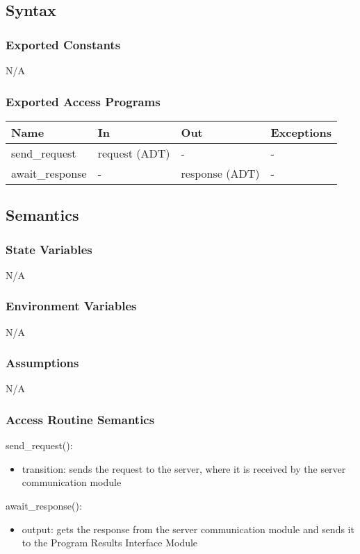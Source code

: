 \documentclass[12pt, titlepage]{article}
\begin{document}
\subsection{Syntax}

\subsubsection{Exported Constants}
N/A

\subsubsection{Exported Access Programs}

\begin{center}
\begin{tabular}{p{3cm} p{4cm} p{4cm} p{2cm}}
\hline
\textbf{Name} & \textbf{In} & \textbf{Out} & \textbf{Exceptions}\\
\hline%
send\_request & request (ADT) &- &-\\
await\_response &- &response (ADT) &-\\
\hline
\end{tabular}
\end{center}

\subsection{Semantics}

\subsubsection{State Variables}
N/A

\subsubsection{Environment Variables}
N/A

\subsubsection{Assumptions}
N/A

\subsubsection{Access Routine Semantics}

\noindent send\_request():
\begin{itemize}
\item transition: sends the request to the server, where it is received by the server communication module 
\end{itemize}
\noindent await\_response():
\begin{itemize} 
  \item output: gets the response from the server communication module and sends it to the Program Results Interface Module  
\end{itemize}
\end{document}
